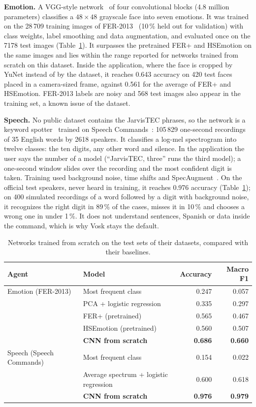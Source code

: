 \documentclass[11pt,letterpaper]{article}
\begin{document}
\textbf{Emotion.} A VGG-style network~\cite{simonyan2015} of four convolutional blocks (4.8 million parameters) classifies a $48 \times 48$ grayscale face into seven emotions. It was trained on the 28\,709 training images of FER-2013~\cite{goodfellow2013} (10\,\% held out for validation) with class weights, label smoothing and data augmentation, and evaluated once on the 7178 test images (Table~\ref{tab:scratch}). It surpasses the pretrained FER+ and HSEmotion on the same images and lies within the range reported for networks trained from scratch on this dataset. Inside the application, where the face is cropped by YuNet instead of by the dataset, it reaches 0.643 accuracy on 420 test faces placed in a camera-sized frame, against 0.561 for the average of FER+ and HSEmotion. FER-2013 labels are noisy and 568 test images also appear in the training set, a known issue of the dataset.

\textbf{Speech.} No public dataset contains the JarvisTEC phrases, so the network is a keyword spotter~\cite{sainath2015} trained on Speech Commands~\cite{warden2018}: 105\,829 one-second recordings of 35 English words by 2618 speakers. It classifies a log-mel spectrogram into twelve classes: the ten digits, any other word and silence. In the application the user says the number of a model (``JarvisTEC, three'' runs the third model); a one-second window slides over the recording and the most confident digit is taken. Training used background noise, time shifts and SpecAugment~\cite{park2019}. On the official test speakers, never heard in training, it reaches 0.976 accuracy (Table~\ref{tab:scratch}); on 400 simulated recordings of a word followed by a digit with background noise, it recognizes the right digit in 89\,\% of the cases, misses it in 10\,\% and chooses a wrong one in under 1\,\%. It does not understand sentences, Spanish or data inside the command, which is why Vosk stays the default.

\begin{table}[H]
\centering
\caption{Networks trained from scratch on the test sets of their datasets, compared with their baselines.}
\label{tab:scratch}
\begin{tabular}{llrr}
\toprule
Agent & Model & Accuracy & Macro F1 \\
\midrule
Emotion (FER-2013) & Most frequent class & 0.247 & 0.057 \\
 & PCA + logistic regression & 0.335 & 0.297 \\
 & FER+ (pretrained) & 0.565 & 0.467 \\
 & HSEmotion (pretrained) & 0.560 & 0.507 \\
 & \textbf{CNN from scratch} & \textbf{0.686} & \textbf{0.660} \\
\midrule
Speech (Speech Commands) & Most frequent class & 0.154 & 0.022 \\
 & Average spectrum + logistic regression & 0.600 & 0.618 \\
 & \textbf{CNN from scratch} & \textbf{0.976} & \textbf{0.979} \\
\bottomrule
\end{tabular}
\end{table}
\end{document}
